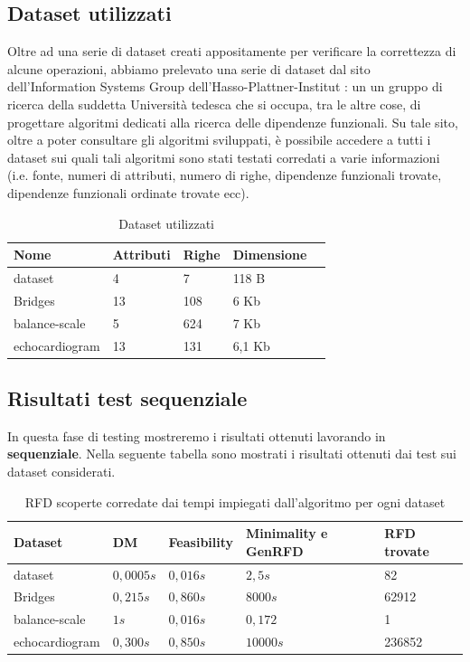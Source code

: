 \subsection{Dataset utilizzati}
Oltre ad una serie di dataset creati appositamente per verificare la correttezza di alcune operazioni, abbiamo prelevato una serie di dataset dal sito dell'Information Systems Group dell'Hasso-Plattner-Institut \cite{metanome}: un un gruppo di ricerca della suddetta Università tedesca che si occupa, tra le altre cose, di progettare algoritmi dedicati alla ricerca delle dipendenze funzionali. Su tale sito, oltre a poter consultare gli algoritmi sviluppati, è possibile accedere a tutti i dataset sui quali tali algoritmi sono stati testati corredati a varie informazioni (i.e. fonte, numeri di attributi, numero di righe, dipendenze funzionali trovate, dipendenze funzionali ordinate trovate ecc).\\
\begin{table}[H]
	\centering
	\begin{tabular}{lllll}
		Nome & Attributi & Righe & Dimensione \\
		\hline
		dataset & 4 & 7 & 118 B \\
		Bridges & 13  & 108 & 6 Kb\\
		balance-scale  & 5  & 624 & 7 Kb\\
		echocardiogram  & 13  & 131 & 6,1 Kb\\
	\end{tabular}
	\caption{Dataset utilizzati}
	\label{datasetUtilizzati}
\end{table}
\subsection{Risultati test sequenziale}
In questa fase di testing mostreremo i risultati ottenuti lavorando in \textbf{sequenziale}.
Nella seguente tabella sono mostrati i risultati ottenuti dai test sui dataset considerati.
\begin{table}[H]
	\centering
	\begin{tabular}{lllll}
		Dataset & DM & Feasibility & Minimality e GenRFD & RFD trovate \\
		\hline
		dataset& $0,0005s$ & $0,016s$ & $2,5s$ & 82 \\
		Bridges & $0,215s$  & $0,860s$ & $8000s$ & 62912 \\
		balance-scale  & $1s$  & $0,016s$ & $0,172$ & 1\\
		echocardiogram  & $0,300s$  & $0,850s$ & $10000s$ & 236852\\
		\hline
	\end{tabular}
	\label{risultati}
	\caption{RFD scoperte corredate dai tempi impiegati dall'algoritmo per ogni dataset}
\end{table}
